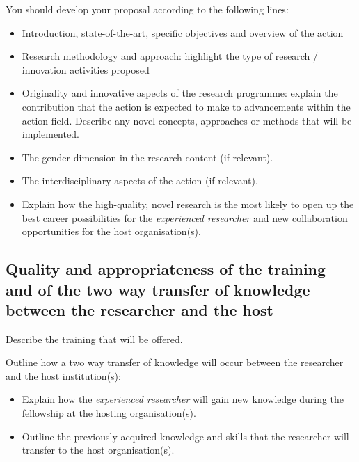 You should develop your proposal according to the following lines:
\begin{itemize}
  \item Introduction, state-of-the-art, specific objectives and overview of the action
  \item Research methodology and approach: highlight the type of research / innovation activities proposed
  \item Originality and innovative aspects of the research programme: explain the contribution that the action is expected to make to advancements within the action field. Describe any novel concepts, approaches or methods that will be implemented.
 \item The gender dimension in the research content (if relevant).

\setlength{\fboxsep}{1mm}

 \item The interdisciplinary aspects of the action (if relevant).
 \item Explain how the high-quality, novel research is the most likely to open up the best career possibilities for the {\em experienced researcher} and new collaboration opportunities for the host organisation(s). 
\end{itemize}




\subsection{Quality and appropriateness of the training and of the two way transfer of knowledge between the researcher and the host}
\label{sec:excellence_transfer}

Describe the training that will be offered.

\medskip\noindent
Outline how a two way transfer of knowledge will occur between the researcher and the host institution(s):
\begin{itemize}
\item Explain how the \emph{experienced researcher} will gain new knowledge during the fellowship at the hosting organisation(s).
\item Outline the previously acquired knowledge and skills that the researcher will transfer to the host organisation(s).
\end{itemize}

